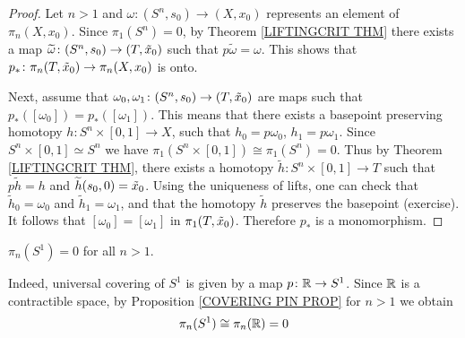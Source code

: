 \begin{proof}
Let $n>1$  and $\omega \colon (S^{n}, s_{0}) \to (X, x_{0})$ represents an element of 
$\pi_{n}(X, x_{0})$. Since $\pi_{1}(S^{n}) = 0$, by Theorem \ref{LIFTINGCRIT THM}
there exists a map $\widetilde\omega \colon (S^{n}, s_{0}) \to (T, \ntilde{x}_{0})$
such that $p\widetilde\omega = \omega$. This shows that 
$p_{\ast}\colon \pi_{n}(T, \ntilde{x}_{0}) \to \pi_{n}(X, x_{0})$ is onto. 

Next, assume that $\omega_{0}, \omega_{1}\colon (S^{n}, s_{0}) \to (T, \ntilde{x}_{0})$
are maps such that $p_{\ast}([\omega_{0}]) = p_{\ast}([\omega_{1}])$. 
This means that there exists a basepoint preserving homotopy 
$h\colon S^{n}\times [0, 1] \to X$, such that $h_{0} = p\omega_{0}$, $h_{1} = p\omega_{1}$. 
Since $S^{n}\times [0, 1] \simeq S^{n}$ we have 
$\pi_{1}(S^{n}\times [0, 1])\cong \pi_{1}(S^{n}) = 0$. Thus by 
Theorem \ref{LIFTINGCRIT THM}, there exists a homotopy 
$\widetilde h\colon S^{n}\times [0, 1] \to T$ such that $p\widetilde h = h$ and
$\widetilde h(s_{0}, 0) = \ntilde{x}_{0}$. Using the uniqueness of lifts, one can check 
that $\widetilde h_{0} = \omega_{0}$ and $\widetilde h_{1} = \omega_{1}$, and that 
the homotopy $\widetilde h$ preserves the basepoint (exercise). It follows that 
$[\omega_{0}] = [\omega_{1}]$ in $\pi_{1}(T, \ntilde{x}_{0})$. Therefore $p_{\ast}$
is a monomorphism. 


\end{proof}



\begin{example}
\label{PIN S1 EXAMPLE}
$\pi_{n}(S^{1}) = 0$ for all $n>1$. 

Indeed, universal covering of $S^{1}$ is given by a map $p\colon {\mathbb R} \to S^{1}$. 
Since ${\mathbb R}$ is a contractible space, by Proposition \ref{COVERING PIN PROP}
for $n>1$ we obtain
\[
\pi_{n}(S^{1}) \cong \pi_{n}({\mathbb R}) = 0
\]
\end{example}


